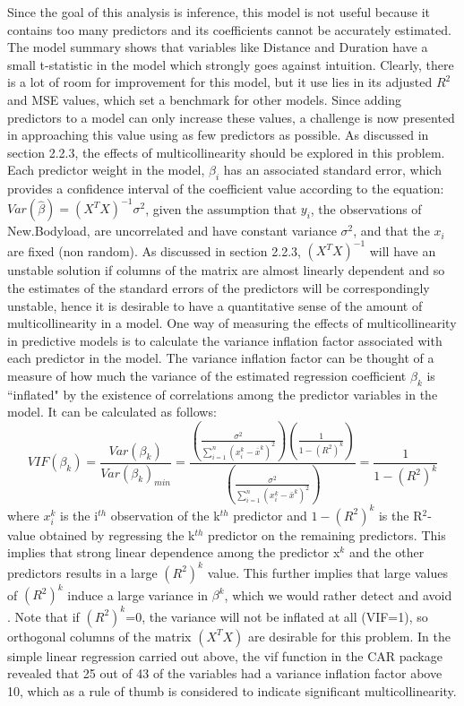 Since the goal of this analysis is inference, this model is not useful because it contains too many predictors and its coefficients cannot be accurately estimated. The model summary shows that variables like Distance and Duration have a small t-statistic in the model which strongly goes against intuition. Clearly, there is a lot of room for improvement for this model, but it use lies in its adjusted $R^2$ and MSE values, which set a benchmark for other models. Since adding predictors to a model can only increase these values, a challenge is now presented in approaching this value using as few predictors as possible.
\hfill\break
\newline
As discussed in section 2.2.3, the effects of multicollinearity should be explored in this problem. Each predictor weight in the model, $\beta_i$ has an associated standard error, which provides a confidence interval of the coefficient value according to the equation: $Var(\hat{\beta})=(X^TX)^{-1}\sigma^2$, given the assumption that $y_i$, the observations of New.Bodyload, are uncorrelated and have constant variance $\sigma^2$, and that the $x_i$ are fixed (non random)\cite{ESL}. As discussed in section 2.2.3, $(X^TX)^{-1}$ will have an unstable solution if columns of the matrix are almost linearly dependent and so the estimates of the standard errors of the predictors will be correspondingly unstable, hence it is desirable to have a quantitative sense of the amount of multicollinearity in a model. One way of measuring the effects of multicollinearity in predictive models is to calculate the variance inflation factor associated with each predictor in the model. The variance inflation factor can be thought of a measure of how much the variance of the estimated regression coefficient $\beta_k$ is ``inflated" by the existence of correlations among the predictor variables in the model. It can be calculated as follows: \[VIF(\beta_k)=\frac{Var(\beta_k)}{Var(\beta_k)_{min}}=
\frac{(\frac{\sigma^2}{\sum_{i=1}^{n}(x_i^k-\bar{x}^k)^2})(\frac{1}{1-(R^2)^k})}
{(\frac{\sigma^2}{\sum_{i=1}^{n}(x_i^k-\bar{x}^k)^2})}=\frac{1}{1-(R^2)^k}\]
where $x_i^k$ is the i$^{th}$ observation of the k$^{th}$ predictor and ${1-(R^2)^k}$ is the R$^2$-value obtained by regressing the k$^{th}$ predictor on the remaining predictors. This implies that strong linear dependence among the predictor x$^k$ and the other predictors results in a large $(R^2)^k$ value. This further implies that large values of $(R^2)^k$ induce a large variance in $\beta^k$, which we would rather detect and avoid \cite{VIF}. Note that if $(R^2)^k$=0, the variance will not be inflated at all (VIF=1), so orthogonal columns of the matrix $(X^TX)$ are desirable for this problem. In the simple linear regression carried out above, the vif function in the CAR package revealed that 25 out of 43 of the variables had a variance inflation factor above 10, which as a rule of thumb is considered to indicate significant multicollinearity\cite{Multicollinearity}.


